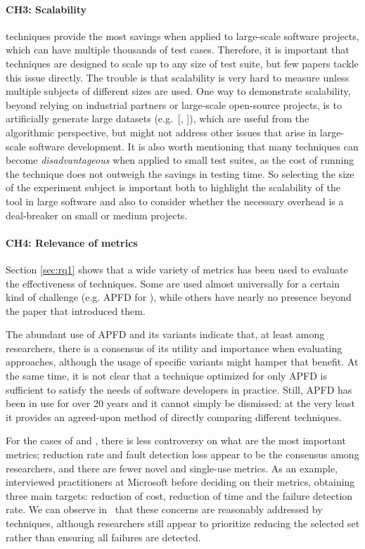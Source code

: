 \paragraph{CH3: Scalability}
\rt techniques provide the most savings when applied to large-scale software projects, which can have multiple thousands of test cases.
Therefore, it is important that techniques are designed to scale up to any size of test suite, but few papers tackle this issue directly.
The trouble is that scalability is very hard to measure unless multiple subjects of different sizes are used.
One way to demonstrate scalability, beyond relying on industrial partners or large-scale open-source projects, is to artificially generate large datasets (e.g.~[, ]), which are useful from the algorithmic perspective, but might not address other issues that arise in large-scale software development.
It is also worth mentioning that many \rt techniques can become \textit{disadvantageous} when applied to small test suites, as the cost of running the technique does not outweigh the savings in testing time.
So selecting the size of the experiment subject is important both to highlight the scalability of the tool in large software and also to consider whether the necessary overhead is a deal-breaker on small or medium projects.


\paragraph{CH4: Relevance of metrics}
Section \ref{sec:rq1} shows that a wide variety of metrics has been used to evaluate the effectiveness of \rt techniques.
Some are used almost universally for a certain kind of challenge (e.g. APFD for \tcp), while others have nearly no presence beyond the paper that introduced them.

The abundant use of APFD and its variants indicate that, at least among researchers, there is a consensus of its utility and importance when evaluating \tcp approaches, although the usage of specific variants might hamper that benefit.
At the same time, it is not clear that a technique optimized for only APFD is sufficient to satisfy the needs of software developers in practice.
Still, APFD has been in use for over 20 years and it cannot simply be dismissed: at the very least it provides an agreed-upon method of directly comparing different techniques.

For the cases of \tcs and \tsr, there is less controversy on what are the most important metrics; reduction rate and fault detection loss appear to be the consensus among researchers, and there are fewer novel and single-use metrics.
As an example,~ interviewed practitioners at Microsoft before deciding on their \tcs metrics, obtaining three main targets: reduction of cost, reduction of time and the failure detection rate.
We can observe in~ that these concerns are reasonably addressed by \tcs techniques, although researchers still appear to prioritize reducing the selected set rather than ensuring all failures are detected.


